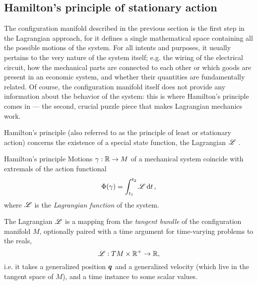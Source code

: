 \subsection{Hamilton's principle of stationary action}
The configuration manifold described in the previous section is the first step in the Lagrangian approach, for it defines a single mathematical space containing all the possible motions of the system. For all intents and purposes, it usually pertains to the very nature of the system itself; e.g. the wiring of the electrical circuit, how the mechanical parts are connected to each other or which goods are present in an economic system, and whether their quantities are fundamentally related. Of course, the configuration manifold itself does not provide any information about the behavior of the system: this is where Hamilton's principle comes in --- the second, crucial puzzle piece that makes Lagrangian mechanics work.

Hamilton's principle (also referred to as the principle of least or stationary action) concerns the existence of a special state function, the Lagrangian $\mathscr{L}$ \cite{Arnold1989}.
\begin{thmblock}{Hamilton's principle}
    Motions $\gamma: \mathbb{R} \to M$ of a mechanical system coincide with extremals of the action functional 
    \begin{equation}
        \Phi(\gamma) = \int_{t_1}^{t_2} \mathscr{L} \dd{t},
        \label{eq:ham_principle}
    \end{equation}
    where $\mathscr{L}$ is the \emph{Lagrangian function} of the system.
\end{thmblock}
The Lagrangian \(\mathscr{L}\) is a mapping from the \emph{tangent bundle}  of the configuration manifold \(M\), optionally paired with a time argument for time-varying problems to the reals,
    \[ \mathscr{L} : TM \times \mathbb{R}^+ \to \mathbb{R}, \]
i.e. it takes a generalized position \(\vb*{q}\) and a generalized velocity  (which live in the tangent space of \(M\)), and a time instance to some scalar values.

